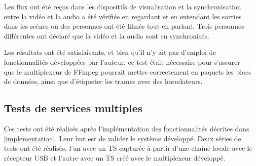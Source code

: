 \documentclass[12pt,a4paper]{article}
\begin{document}



Les flux ont été reçus dans les dispositifs de visualisation et la synchronisation entre la vidéo et la audio a été vérifiée en regardant et en entendant les sorties dans les scènes où des personnes ont été filmés tout en parlant. Trois personnes différentes ont déclaré que la vidéo et la audio sont en synchronisés.

Les résultats ont été satisfaisants, et bien qu'il n'y ait pas d'emploi de fonctionnalités développées par l'auteur, ce test était nécessaire pour s'assurer que le multiplexeur de FFmpeg pourrait mettre correctement en paquets les blocs de données, ainsi que d'étiqueter les trames avec des horodateurs.

\subsection{Tests de services multiples}


Ces tests ont été réalisés après l'implémentation des fonctionnalités décrites dans \autoref{implementation}. Leur but est de valider le système développé. Deux séries de tests ont été réalisés, l'un avec un TS capturée à partir d'une chaîne locale avec le récepteur USB et l'autre avec un TS créé avec le multiplexeur développé.
\end{document}
